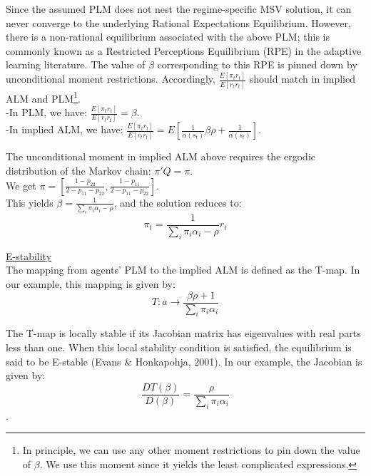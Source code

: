\documentclass[12pt,reqno]{article}
\numberwithin{equation}{section}
\begin{document}
Since the assumed PLM does not nest the regime-specific MSV solution, it can never converge to the underlying Rational Expectations Equilibrium. However, there is a non-rational equilibrium associated with the above PLM; this is commonly known as a Restricted Perceptions Equilibrium (RPE) in the adaptive learning literature. The value of $\beta$ corresponding to this RPE is pinned down by unconditional moment restrictions. Accordingly, $\frac{E [\pi_t r_t]}{E[r_t r_t]} $ should match in implied ALM and PLM\footnote{In principle, we can use any other moment restrictions to pin down the value of $\beta$. We use this moment since it yields the least complicated expressions.}. \\

-In PLM, we have: $\frac{E [\pi_t r_t]}{E[r_t r_t]} =\beta $.\\

-In implied ALM, we have: $\frac{ E[\pi_t r_t]}{E[r_t r_t]} = E[ \frac{1}{\alpha(s_t)} \beta \rho + \frac{1}{\alpha(s_t)}]$.

The unconditional moment in implied ALM above requires the ergodic distribution of the Markov chain: $ \pi' Q = \pi $. \\

We get $ \pi = [ \frac{1-p_{22}}{2-p_{11}- p_{22}}, \frac{1-p_{11}}{2-p_{11}-p_{22}}] $. \\

This yields $ \beta = \frac{1}{\sum_i \pi_i \alpha_i  -\rho } $, and the solution reduces to: \\

$$ \pi_t = \frac{1}{\sum_i \pi_i \alpha_i  -\rho} r_t $$

\newpage

\underline{E-stability} \\

The mapping from agents' PLM to the implied ALM is defined as the T-map. In our example, this mapping is given by: \\

$$ T: a \rightarrow \frac{\beta \rho + 1 }{\sum_i \pi_i \alpha_i} $$

The T-map is locally stable if its Jacobian matrix has eigenvalues with real parts less than one. When this local stability condition is satisfied, the equilibrium is said to be E-stable (Evans \& Honkapohja, 2001). In our example, the Jacobian is given by: \\

$$ \frac{DT(\beta)}{D(\beta)} = \frac{\rho}{\sum_i \pi_i \alpha_i} $$. 
\end{document}

